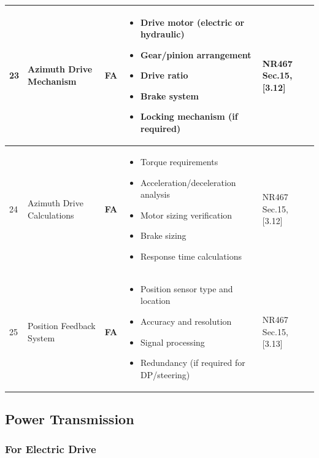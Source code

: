 \documentclass[11pt,a4paper]{report}
\newcommand{\fa}{\textbf{\textcolor{warningred}{FA}}}
\begin{document}
\begin{longtable}{|p{0.5cm}|p{5cm}|p{1.5cm}|p{5.5cm}|p{2cm}|}
23 & Azimuth Drive Mechanism & \fa{} & 
\begin{itemize}[leftmargin=*,nosep]
\item Drive motor (electric or hydraulic)
\item Gear/pinion arrangement
\item Drive ratio
\item Brake system
\item Locking mechanism (if required)
\end{itemize} & NR467 Sec.15, [3.12] \\
\hline

24 & Azimuth Drive Calculations & \fa{} & 
\begin{itemize}[leftmargin=*,nosep]
\item Torque requirements
\item Acceleration/deceleration analysis
\item Motor sizing verification
\item Brake sizing
\item Response time calculations
\end{itemize} & NR467 Sec.15, [3.12] \\
\hline

25 & Position Feedback System & \fa{} & 
\begin{itemize}[leftmargin=*,nosep]
\item Position sensor type and location
\item Accuracy and resolution
\item Signal processing
\item Redundancy (if required for DP/steering)
\end{itemize} & NR467 Sec.15, [3.13] \\
\hline

\end{longtable}

\subsection{Power Transmission}

\subsubsection{For Electric Drive}
\end{document}
